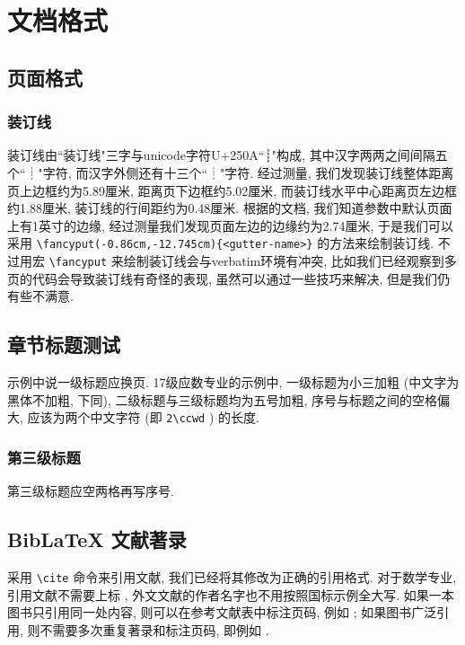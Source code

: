 
\section{文档格式}

\subsection{页面格式}

\subsubsection{装订线}

装订线由``装订线"三字与unicode字符U+250A``┊"构成, 其中汉字两两之间间隔五个``┊"字符, 而汉字外侧还有十三个``┊"字符. 经过测量, 我们发现装订线整体距离页上边框约为5.89厘米, 距离页下边框约5.02厘米, 而装订线水平中心距离页左边框约1.88厘米, 装订线的行间距约为0.48厘米. 根据的文档, 我们知道参数中默认页面上有1英寸的边缘, 经过测量我们发现页面左边的边缘约为2.74厘米, 于是我们可以采用 \verb|\fancyput(-0.86cm,-12.745cm){<gutter-name>}| 的方法来绘制装订线. 不过用宏 \verb|\fancyput| 来绘制装订线会与verbatim环境有冲突, 比如我们已经观察到多页的代码会导致装订线有奇怪的表现, 虽然可以通过一些技巧来解决, 但是我们仍有些不满意.

\subsection{章节标题测试}

示例中说一级标题应换页. 17级应数专业的示例中, 一级标题为小三加粗 (中文字为黑体不加粗, 下同), 二级标题与三级标题均为五号加粗, 序号与标题之间的空格偏大, 应该为两个中文字符 (即 \verb|2\ccwd| ) 的长度.

\subsubsection{第三级标题}

第三级标题应空两格再写序号.

\zhlipsum[1]

\subsection{BibLaTeX 文献著录}

采用 \verb|\cite| 命令来引用文献, 我们已经将其修改为正确的引用格式. 对于数学专业, 引用文献不需要上标 \cite{atiyah_introduction_1969}, 外文文献的作者名字也不用按照国标示例全大写. 如果一本图书只引用同一处内容, 则可以在参考文献表中标注页码, 例如 \cite{herrlich_axiom_2006}; 如果图书广泛引用, 则不需要多次重复著录和标注页码, 即例如 \cite{atiyah_introduction_1969}.

